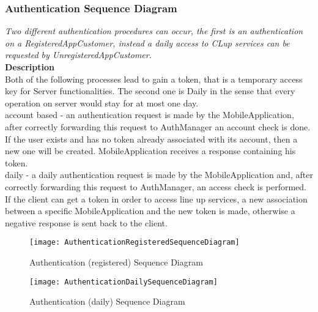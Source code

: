 \subsubsection{Authentication Sequence Diagram}
\textit{Two different authentication procedures can occur, the first is an authentication on a RegisteredAppCustomer, instead a daily access to CLup services can be requested by UnregisteredAppCustomer.\\}
\textbf{Description\\}
Both of the following processes lead to gain a token, that is a temporary access key for Server functionalities. The second one is Daily in the sense that every operation on server would stay for at most one day.\\
account based - an authentication request is made by the MobileApplication, after correctly forwarding this request to AuthManager an account check is done. If the user exists and has no token already associated with its account, then a new one will be created. MobileApplication receives a response containing his token. \\
daily - a daily authentication request is made by the MobileApplication and, after correctly forwarding this request to AuthManager, an access check is performed. If the client can get a token in order to access line up services, a new association between a specific MobileApplication and the new token is made, otherwise a negative response is sent back to the client. \\

\begin{figure}[H]
 \centering
 \texttt{[image: AuthenticationRegisteredSequenceDiagram]}
 \caption{ Authentication (registered) Sequence Diagram}
 \end{figure}

\newpage
\begin{figure}[H]
 \centering
 \texttt{[image: AuthenticationDailySequenceDiagram]}
 \caption{Authentication (daily) Sequence Diagram}
 \end{figure}

\newpage
